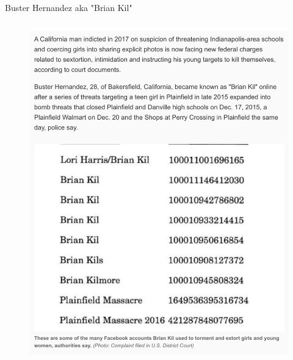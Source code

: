 \documentclass[nobackground,dvipsnames,table]{beamer}
\begin{document}
\begin{frame}{Buster Hernandez aka "Brian Kil"}
\begin{columns}
\begin{figure}
                \includegraphics[width=\textwidth]{brian-kil-article}
            \end{figure}
    \end{columns}
\end{frame}
\end{document}
